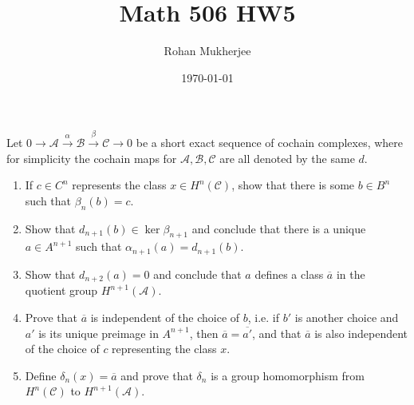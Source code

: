 \documentclass[12pt]{article}
\title{Math 506 HW5}
\date{\today}
\author{Rohan Mukherjee}
\theoremstyle{definition}
\newenvironment{theorem}{\begin{mytheorem}}{\end{mytheorem}}
\theoremstyle{definitionstyle}
\begin{document}
    \maketitle
    \begin{theorem}
        Let $0 \to \mathscr{A} \overset{\alpha}{\to} \mathscr{B} \overset{\beta}{\to} \mathscr{C} \to 0$ be a short exact sequence of cochain complexes, where for simplicity the cochain maps for $\mathscr{A}, \mathscr{B}, \mathscr{C}$ are all denoted by the same $d$. 
        \begin{enumerate}[label=(\alph*)]
            \item If $c \in C^n$ represents the class $x \in H^n(\mathscr{C})$, show that there is some $b \in B^n$ such that $\beta_n(b) = c$.
            \item Show that $d_{n+1}(b) \in \ker \beta_{n+1}$ and conclude that there is a unique $a \in A^{n+1}$ such that $\alpha_{n+1}(a) = d_{n+1}(b)$.
            \item Show that $d_{n+2}(a) = 0$ and conclude that $a$ defines a class $\overline a$ in the quotient group $H^{n+1}(\mathscr A)$.
            \item Prove that $\overline a$ is independent of the choice of $b$, i.e. if $b'$ is another choice and $a'$ is its unique preimage in $A^{n+1}$, then $\overline a = \overline{a'}$, and that $\overline a$ is also independent of the choice of $c$ representing the class $x$.
            \item Define $\delta_n(x) = \overline a$ and prove that $\delta_n$ is a group homomorphism from $H^n(\mathscr C)$ to $H^{n+1}(\mathscr A)$.
        \end{enumerate}
    \end{theorem}
\end{document}
